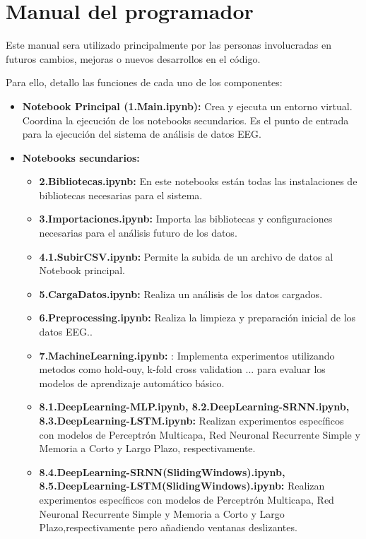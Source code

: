   
  

\section{Manual del programador}

Este manual sera utilizado principalmente por las personas involucradas en futuros cambios, mejoras o nuevos desarrollos en el código.

Para ello, detallo las funciones de cada uno de los componentes:

  \begin{itemize}
  \tightlist
  \item
   \textbf{Notebook Principal (1.Main.ipynb):} Crea y ejecuta un entorno virtual. Coordina la ejecución de los notebooks secundarios. Es el punto de entrada para la ejecución del sistema de análisis de datos EEG.
  \item
   \textbf{Notebooks secundarios:}
   \begin{itemize}
   \tightlist
   \item
    \textbf{2.Bibliotecas.ipynb:} En este notebooks están todas las instalaciones de bibliotecas necesarias para el sistema.
   \item
    \textbf{3.Importaciones.ipynb:} Importa las bibliotecas y configuraciones necesarias para el análisis futuro de los datos.
   \item
    \textbf{4.1.SubirCSV.ipynb:} Permite la subida de un archivo de datos al Notebook principal.
   \item
    \textbf{5.CargaDatos.ipynb:} Realiza un análisis de los datos cargados.
   \item
    \textbf{6.Preprocessing.ipynb:} Realiza la limpieza y preparación inicial de los datos EEG..
   \item
    \textbf{7.MachineLearning.ipynb:} : Implementa experimentos utilizando metodos como hold-ouy, k-fold cross validation ... para evaluar los modelos de aprendizaje automático básico.
   \item
    \textbf{8.1.DeepLearning-MLP.ipynb, 8.2.DeepLearning-SRNN.ipynb, 8.3.DeepLearning-LSTM.ipynb:} Realizan experimentos específicos con modelos de Perceptrón Multicapa, Red Neuronal Recurrente Simple y Memoria a Corto y Largo Plazo, respectivamente.
   \item
    \textbf{8.4.DeepLearning-SRNN(SlidingWindows).ipynb, 8.5.DeepLearning-LSTM(SlidingWindows).ipynb:} Realizan experimentos específicos con modelos de Perceptrón Multicapa, Red Neuronal Recurrente Simple y Memoria a Corto y Largo Plazo,respectivamente pero añadiendo ventanas deslizantes.

\end{itemize}
\end{itemize}
